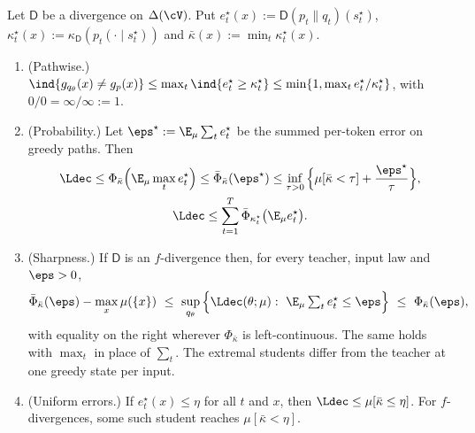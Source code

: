 \begin{theorem}\label{thm:greedy}
\Pv\Ck Let $\mathsf D$ be a divergence on $\Delta(\cV)$. Put $e^\star_t(x):=\mathsf D(p_t\|q_t)(s^\star_t)$,
$\kappa^\star_t(x):=\kappa_{\mathsf D}(p_t(\cdot\mid s^\star_t))$ and $\bar\kappa(x):=\min_t\kappa^\star_t(x)$.
\begin{enumerate}[label=(\roman*),nosep]
\item (Pathwise.) $\ind\{g_{q_\theta}(x)\ne g_p(x)\}\le\max_t\ind\{e^\star_t\ge\kappa^\star_t\}\le\min\{1,\max_te^\star_t/\kappa^\star_t\}$, with
$0/0=\infty/\infty:=1$.
\item (Probability.) Let $\eps^\star:=\E_\mu\sum_te^\star_t$ be the summed per-token error on greedy paths. Then
\begin{gather*}
\Ldec\le\Phi_{\bar\kappa}\Big(\E_\mu\max_te^\star_t\Big)\le\bar\Phi_{\bar\kappa}(\eps^\star)\le\inf_{\tau>0}\Big\{\mu[\bar\kappa<\tau]+\frac{\eps^\star}\tau\Big\},\\
\Ldec\le\sum_{t=1}^T\bar\Phi_{\kappa^\star_t}\big(\E_\mu e^\star_t\big).
\end{gather*}
\item (Sharpness.) If $\mathsf D$ is an $f$-divergence then, for every teacher, input law and $\eps>0$,
\[
\bar\Phi_{\bar\kappa}(\eps)-\max_x\mu(\{x\})\ \le\ \sup_{q_\theta}\Big\{\Ldec(\theta;\mu):\ \E_\mu\textstyle\sum_te^\star_t\le\eps\Big\}\ \le\ \Phi_{\bar\kappa}(\eps),
\]
with equality on the right wherever $\Phi_{\bar\kappa}$ is left-continuous. The same holds with $\max_t$ in place of
$\sum_t$. The extremal students differ from the teacher at one greedy state per input.
\item (Uniform errors.) If $e^\star_t(x)\le\eta$ for all $t$ and $x$, then $\Ldec\le\mu[\bar\kappa\le\eta]$. For $f$-divergences,
some such student reaches $\mu[\bar\kappa<\eta]$.
\end{enumerate}
\end{theorem}
